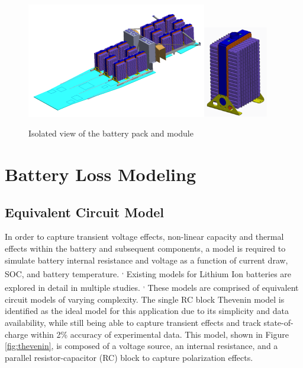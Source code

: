\documentclass[]{aiaa-tc}%
\begin{document}
\begin{figure}[!htb]%
	\centering
	\includegraphics[width=0.7\textwidth]{figures/pallet.png}\includegraphics[width=0.25\textwidth]{figures/block.png}
	\caption{Isolated view of the battery pack and module}
	\label{fig:pallet}
\end{figure}


\section{Battery Loss Modeling} \label{BLM}

\subsection{Equivalent Circuit Model}

In order to capture transient voltage effects, non-linear capacity and thermal effects within the battery and subsequent components, a model is required to simulate battery internal resistance and voltage as a function of current draw, SOC, and battery temperature. \cite{Hu2}\textsuperscript{,} \cite{Fotouhi} 
Existing models for Lithium Ion batteries are explored in detail in multiple studies. \cite{Huria}\textsuperscript{,} \cite{Hu} These models are comprised of equivalent circuit models of varying complexity. The single RC block Thevenin model is identified as the ideal model for this application due to its simplicity and data availability, while still being able to capture transient effects and track state-of-charge within 2\% accuracy of experimental data. This model, shown in Figure \ref{fig:thevenin}, is composed of a voltage source, an internal resistance, and a parallel resistor-capacitor (RC) block to capture polarization effects. 
\end{document}
